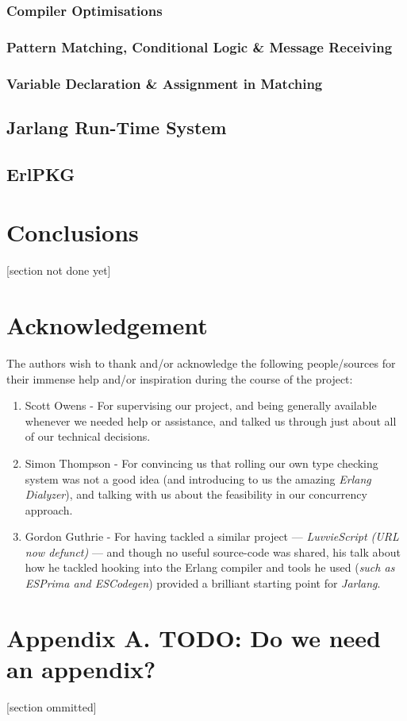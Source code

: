 \documentclass[twoside,12pt,titlepage,a4paper]{article}
\begin{document}
\subsubsection{Compiler Optimisations}
\subsubsection{Pattern Matching, Conditional Logic \& Message Receiving}
\subsubsection{Variable Declaration \& Assignment in Matching}
\subsection{Jarlang Run-Time System}
\subsection{ErlPKG}

\section{Conclusions}
\label{Conclusions}

 [section not done yet]

\section{Acknowledgement}
	The authors wish to thank and/or acknowledge the following people/sources for their immense help and/or inspiration during the course of the project:
	\begin{enumerate}
		\item Scott Owens - For supervising our project, and being generally available whenever we needed help or assistance, and talked us through just about all of our technical decisions.
		\item Simon Thompson - For convincing us that rolling our own type checking system was not a good idea (and introducing to us the amazing \textit{Erlang Dialyzer}), and talking with us about the feasibility in our concurrency approach.
		\item Gordon Guthrie - For having tackled a similar project --- \textit{LuvvieScript (URL now defunct)} --- and though no useful source-code was shared, his talk about how he tackled hooking into the Erlang compiler and tools he used (\textit{such as ESPrima and ESCodegen}) provided a brilliant starting point for \textit{Jarlang}.
	\end{enumerate}

\appendix
\section*{Appendix A. TODO: Do we need an appendix?}


[section ommitted]



\vskip 0.2in


\end{document}
